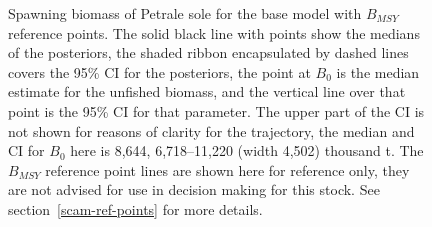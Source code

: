 \documentclass[11pt]{book}
\begin{document}
\begin{figure}[H]

{\centering {} 

}

\caption{Spawning biomass of Petrale sole for the base model with \(B_{MSY}\) reference points. The solid black line with points show the medians of the posteriors, the shaded ribbon encapsulated by dashed lines covers the 95\% CI for the posteriors, the point at \(B_0\) is the median estimate for the unfished biomass, and the vertical line over that point is the 95\% CI for that parameter. The upper part of the CI is not shown for reasons of clarity for the trajectory, the median and CI for \(B_0\) here is 8,644, 6,718--11,220 (width 4,502) thousand t. The \(B_{MSY}\) reference point lines are shown here for reference only, they are not advised for use in decision making for this stock. See section~\ref{scam-ref-points} for more details.}\label{fig:fig-base-sb}
\end{figure}
\end{document}
